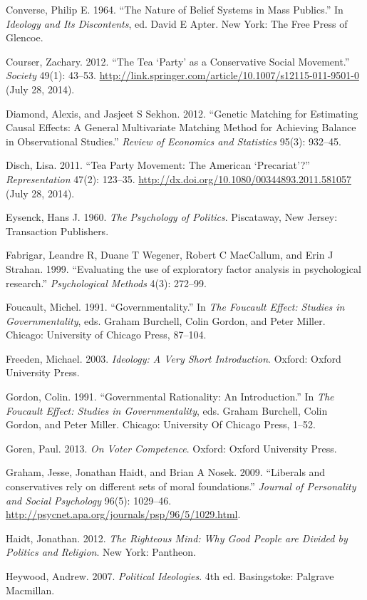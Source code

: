 \documentclass[12pt,]{article}
\begin{document}
Converse, Philip E. 1964. ``The Nature of Belief Systems in Mass
Publics.'' In \emph{Ideology and Its Discontents}, ed. David E Apter.
New York: The Free Press of Glencoe.

Courser, Zachary. 2012. ``The Tea `Party' as a Conservative Social
Movement.'' \emph{Society} 49(1): 43--53.
\url{http://link.springer.com/article/10.1007/s12115-011-9501-0} (July
28, 2014).

Diamond, Alexis, and Jasjeet S Sekhon. 2012. ``Genetic Matching for
Estimating Causal Effects: A General Multivariate Matching Method for
Achieving Balance in Observational Studies.'' \emph{Review of Economics
and Statistics} 95(3): 932--45.

Disch, Lisa. 2011. ``Tea Party Movement: The American `Precariat'?''
\emph{Representation} 47(2): 123--35.
\url{http://dx.doi.org/10.1080/00344893.2011.581057} (July 28, 2014).

Eysenck, Hans J. 1960. \emph{The Psychology of Politics}. Piscataway,
New Jersey: Transaction Publishers.

Fabrigar, Leandre R, Duane T Wegener, Robert C MacCallum, and Erin J
Strahan. 1999. ``Evaluating the use of exploratory factor analysis in
psychological research.'' \emph{Psychological Methods} 4(3): 272--99.

Foucault, Michel. 1991. ``Governmentality.'' In \emph{The Foucault
Effect: Studies in Governmentality}, eds. Graham Burchell, Colin Gordon,
and Peter Miller. Chicago: University of Chicago Press, 87--104.

Freeden, Michael. 2003. \emph{Ideology: A Very Short Introduction}.
Oxford: Oxford University Press.

Gordon, Colin. 1991. ``Governmental Rationality: An Introduction.'' In
\emph{The Foucault Effect: Studies in Governmentality}, eds. Graham
Burchell, Colin Gordon, and Peter Miller. Chicago: University Of Chicago
Press, 1--52.

Goren, Paul. 2013. \emph{On Voter Competence}. Oxford: Oxford University
Press.

Graham, Jesse, Jonathan Haidt, and Brian A Nosek. 2009. ``Liberals and
conservatives rely on different sets of moral foundations.''
\emph{Journal of Personality and Social Psychology} 96(5): 1029--46.
\url{http://psycnet.apa.org/journals/psp/96/5/1029.html}.

Haidt, Jonathan. 2012. \emph{The Righteous Mind: Why Good People are
Divided by Politics and Religion}. New York: Pantheon.

Heywood, Andrew. 2007. \emph{Political Ideologies}. 4th ed. Basingstoke:
Palgrave Macmillan.
\end{document}
